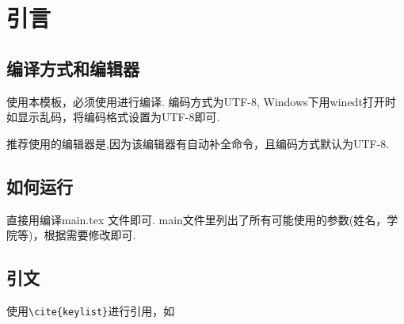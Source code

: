 \chapter{引言}
\section{编译方式和编辑器}
使用本模板，必须使用\XeLaTeX 进行编译. 编码方式为UTF-8, Windows下用winedt打开时如显示乱码，将编码格式设置为UTF-8即可.

推荐使用的编辑器是\TeXstudio,因为该编辑器有自动补全命令，且编码方式默认为UTF-8.

\section{如何运行}
直接用\XeLaTeX 编译main.tex 文件即可. main文件里列出了所有可能使用的参数(姓名，学院等)，根据需要修改即可.
\section{引文}
使用\verb|\cite{keylist}|进行引用，如\cite{li2006numerical}